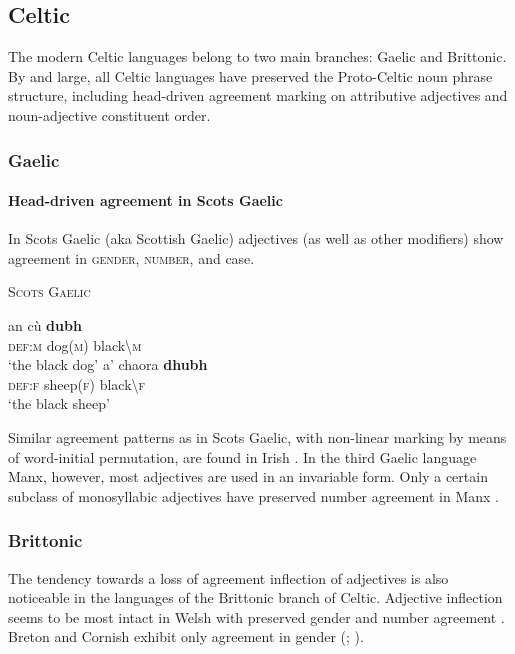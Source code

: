 \subsection{Celtic}
The modern Celtic languages belong to two main branches: Gaelic and Brittonic. By and large, all Celtic languages have preserved the Proto-Celtic noun phrase structure, including head-driven agreement marking on attributive adjectives and noun-adjective constituent order.

\subsubsection{Gaelic}
\paragraph{Head-driven agreement in Scots Gaelic} 
In Scots Gaelic (aka Scottish Gaelic) adjectives (as well as other modifiers) show agreement in \textsc{gender, number}, and {\sc case}.
\begin{exe}
\ex \textsc{Scots Gaelic} \cite[201]{macauley1992}
\begin{xlist}
\ex
\gll	an cù \textbf{dubh}\\
	\textsc{def:m} dog(\textsc{m}) black\textbackslash\textsc{m}\\
\glt	‘the black dog’
\ex
\gll	a' chaora \textbf{dhubh}\\
	\textsc{def:f} sheep(\textsc{f}) black\textbackslash\textsc{f}\\
\glt	‘the black sheep’
\end{xlist}
\end{exe}
Similar agreement patterns as in Scots Gaelic, with non-linear marking by means of word-initial permutation, are found in Irish \cite[73, 97]{odochartaigh1992}. In the third Gaelic language Manx, however, most adjectives are used in an invariable form. Only a certain subclass of monosyllabic adjectives have preserved number agreement in Manx \cite[127]{thomsen1992}.

\subsubsection{Brittonic}
The tendency towards a loss of agreement inflection of adjectives is also noticeable in the languages of the Brittonic branch of Celtic. Adjective inflection seems to be most intact in Welsh with preserved gender and number agreement \cite[298–299]{thomas1992a}. Breton and Cornish exhibit only agreement in gender (\citealt[405]{ternes1992}; \citealt[355]{thomas1992b}).

